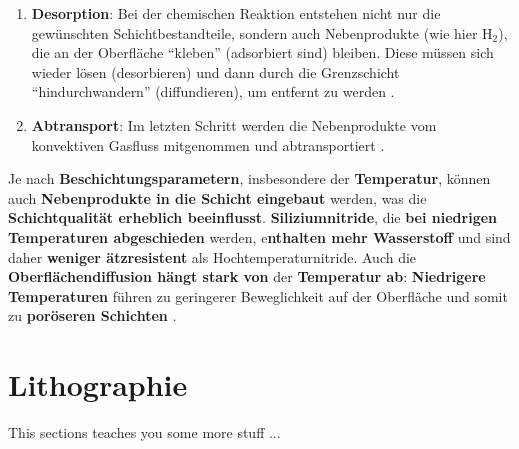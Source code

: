 \documentclass{article} %
\begin{document}
\begin{enumerate}
    \item \textbf{Desorption}: Bei der chemischen Reaktion entstehen nicht nur die gewünschten Schichtbestandteile, sondern auch Nebenprodukte (wie hier H$_2$), 
    die an der Oberfläche ``kleben'' (adsorbiert sind) bleiben. Diese müssen sich wieder lösen (desorbieren) und dann durch die Grenzschicht ``hindurchwandern'' 
    (diffundieren), um entfernt zu werden \cite{keplinger2024CVD}.
    \item \textbf{Abtransport}: Im letzten Schritt werden die Nebenprodukte vom konvektiven Gasfluss mitgenommen und abtransportiert \cite{keplinger2024CVD}.
\end{enumerate}

Je nach \textbf{Beschichtungsparametern}, insbesondere der \textbf{Temperatur}, können auch \textbf{Nebenprodukte in die Schicht eingebaut} werden, was die 
\textbf{Schichtqualität erheblich beeinflusst}. \textbf{Siliziumnitride}, die \textbf{bei niedrigen Temperaturen abgeschieden} werden, e\textbf{nthalten mehr 
Wasserstoff} und sind daher \textbf{weniger ätzresistent} als Hochtemperaturnitride. Auch die \textbf{Oberflächendiffusion hängt stark von} der \textbf{Temperatur 
ab}: \textbf{Niedrigere Temperaturen} führen zu geringerer Beweglichkeit auf der Oberfläche und somit zu \textbf{poröseren Schichten} \cite{keplinger2024CVD}.

\vspace{1em}
\section{Lithographie} %
This sections teaches you some more stuff ...

\thispagestyle{empty}
\newpage
\end{document}
